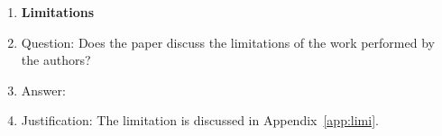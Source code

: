 \begin{enumerate}
\item {\bf Limitations}
    \item[] Question: Does the paper discuss the limitations of the work performed by the authors?
    \item[] Answer: \answerYes{} %
    \item[] Justification: The limitation is discussed in Appendix~\ref{app:limi}.


\end{enumerate}
